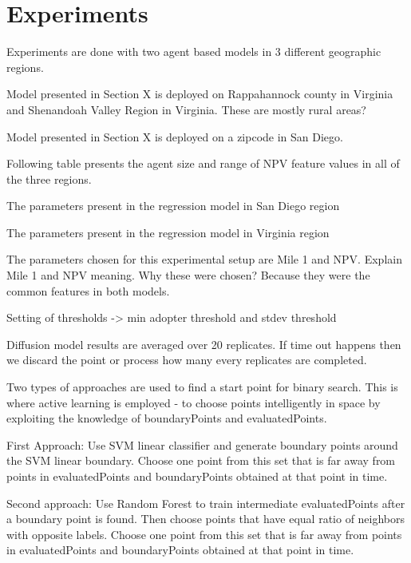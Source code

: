 \section{Experiments}

Experiments are done with two agent based models in 3 different geographic regions.

Model presented in Section X is deployed on Rappahannock county in Virginia and Shenandoah Valley Region in Virginia. These are mostly rural areas?

Model presented in Section X is deployed on a zipcode in San Diego.

Following table presents the agent size and range of NPV feature values in all of the three regions. 

The parameters present in the regression model in San Diego region

The parameters present in the regression model in Virginia region


The parameters chosen for this experimental setup are Mile 1 and NPV. Explain Mile 1 and NPV meaning. Why these were chosen? Because they were the common features in both models.


Setting of thresholds -> min adopter threshold and stdev threshold

Diffusion model results are averaged over 20 replicates. If time out happens then we discard the point or process how many every replicates are completed.

Two types of approaches are used to find a start point for binary search. This is where active learning is employed - to choose points intelligently in space by exploiting the knowledge of boundaryPoints and evaluatedPoints.

First Approach:
Use SVM linear classifier and generate boundary points around the SVM linear boundary.
Choose one point from this set that is far away from points in evaluatedPoints and boundaryPoints obtained at that point in time.

Second approach:
Use Random Forest to train intermediate evaluatedPoints after a boundary point is found. Then choose points that have equal ratio of neighbors with opposite labels. Choose one point from this set that is far away from points in evaluatedPoints and boundaryPoints obtained at that point in time.

